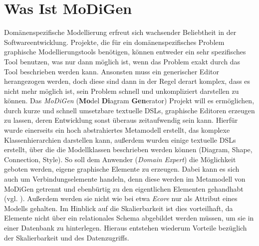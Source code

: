 \section{Was Ist MoDiGen}\label{modigen}
Domänenspezifische Modellierung erfreut sich wachsender Beliebtheit in der Softwareentwicklung. Projekte, die für ein domänenspezifisches Problem graphische Modellierungstools benötigen, können entweder ein sehr spezifisches Tool benutzen, was nur dann möglich ist, wenn das Problem exakt durch das Tool beschrieben werden kann. Ansonsten muss ein generischer Editor herangezogen werden, doch diese sind dann in der Regel derart komplex, dass es nicht mehr möglich ist, sein Problem schnell und unkompliziert darstellen zu können. Das \textit{MoDiGen} (\textbf{Mo}del \textbf{Di}agram \textbf{Gen}erator) Projekt will es ermöglichen, durch kurze und schnell umsetzbare textuelle DSLs, graphische Editoren erzeugen zu lassen, deren Entwicklung sonst überaus zeitaufwendig sein kann. Hierfür wurde einerseits ein hoch abstrahiertes Metamodell erstellt, das komplexe Klassenhierarchien darstellen kann, außerdem wurden einige textuelle DSLs erstellt, über die die Modellklassen beschrieben werden können (Diagram, Shape, Connection, Style). So soll dem Anwender (\textit{Domain Expert}) die Möglichkeit geboten werden, eigene graphische Elemente zu erzeugen. Dabei kann es sich auch um Verbindungselemente handeln, denn diese werden im Metamodell von MoDiGen getrennt und ebenbürtig zu den eigentlichen Elementen gehandhabt (vgl. ). Außerdem werden sie nicht wie bei etwa \textit{Ecore} nur als Attribut eines Modells gehalten. Im Hinblick auf die Skalierbarkeit ist dies vorteilhaft, da Elemente nicht über ein relationales Schema abgebildet werden müssen, um sie in einer Datenbank zu hinterlegen. Hieraus entstehen wiederum Vorteile bezüglich der Skalierbarkeit und des Datenzugriffs.
